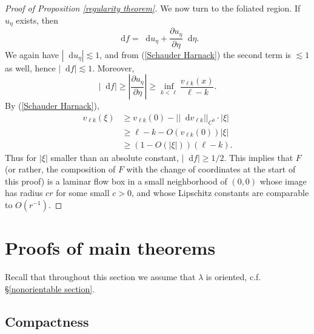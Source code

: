 \documentclass[reqno,11pt]{amsart}
\newcommand{\RR}{\mathbf{R}}
\newcommand*\dif{\mathop{}\!\mathrm{d}}
\newcommand{\Hypspace}{\mathscr H}
\newcommand{\normal}{\mathbf n}
\newcommand{\loc}{\mathrm{loc}}
\newtheorem{lemma}[theorem]{Lemma}
\theoremstyle{definition}
\numberwithin{equation}{section}
\begin{document}
\begin{proof}[Proof of Proposition \ref{regularity theorem}]
We now turn to the foliated region. If $u_\eta$ exists, then
$$\dif f = \dif u_\eta + \frac{\partial u_\eta}{\partial \eta} \dif \eta.$$
We again have $|\dif u_\eta| \lesssim 1$, and from (\ref{Schauder Harnack}) the second term is $\lesssim 1$ as well, hence $|\dif f| \lesssim 1$.
Moreover,
$$|\dif f| \geq \left|\frac{\partial u_\eta}{\partial \eta}\right| \geq \inf_{k < \ell} \frac{v_{\ell k}(x)}{\ell - k}.$$
By (\ref{Schauder Harnack}),
\begin{align*}
	v_{\ell k}(\xi) &\geq v_{\ell k}(0) - ||\dif v_{\ell k}||_{C^0} \cdot |\xi| \\
	&\geq \ell - k - O(v_{\ell k}(0)) |\xi| \\
	&\geq (1 - O(|\xi|)) (\ell - k).
\end{align*}
Thus for $|\xi|$ smaller than an absolute constant, $|\dif f| \geq 1/2$.
This implies that $F$ (or rather, the composition of $F$ with the change of coordinates at the start of this proof) is a laminar flow box in a small neighborhood of $(0, 0)$ whose image has radius $cr$ for some small $c > 0$, and whose Lipschitz constants are comparable to $O(r^{-1})$.
\end{proof}

\section{Proofs of main theorems}\label{CompactnessSec}
Recall that throughout this section we assume that $\lambda$ is oriented, c.f. \S\ref{nonorientable section}.

\subsection{Compactness}

\end{document}
